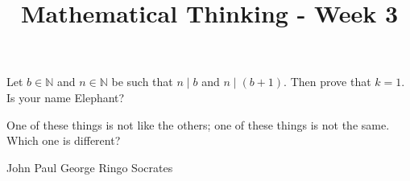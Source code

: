 \documentclass[12pt]{exam}
\title{Mathematical Thinking - Week 3}
\begin{document}
\maketitle
\tableofcontents
\pointsinrightmargin
\begin{questions}
\question[1]  Let $b \in \mathbb{N}$ and $n \in \mathbb{N}$ be such that $n \mid b$ and $n \mid (b+1)$. Then prove that  $k=1$. 
\question[1] Is your name Elephant?
\question
One of these things is not like the others; one of these things is not
the same. Which one is different?
\begin{choices}
\choice John
\choice Paul
\choice George
\choice Ringo
\choice Socrates
\end{choices}
\end{questions}
\end{document}
